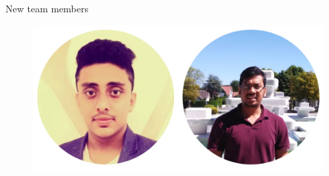 \begin{frame}{New team members}

\begin{figure}[htbp]
	\centering
	\includegraphics[width=1\textwidth]{figures/NewMembers}
\end{figure}

\end{frame}